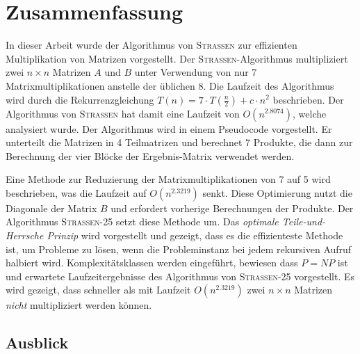 \documentclass[oneside]{scrbook}
\numberwithin{equation}{section}
\begin{document}
\chapter{Zusammenfassung}
In dieser Arbeit wurde der Algorithmus von \textsc{Strassen} zur effizienten Multiplikation von Matrizen vorgestellt. Der \textsc{Strassen}-Algorithmus multipliziert zwei $n \times n$ Matrizen $A$ und $B$ unter Verwendung von nur 7 Matrixmultiplikationen anstelle der üblichen 8. Die Laufzeit des Algorithmus wird durch die Rekurrenzgleichung $T(n) = 7 \cdot T\left(\frac{n}{2}\right) + c \cdot n^2$ beschrieben. Der Algorithmus von \textsc{Strassen} hat damit eine Laufzeit von $O(n^{2.8074})$, welche analysiert wurde. Der Algorithmus wird in einem Pseudocode vorgestellt. Er unterteilt die Matrizen in 4 Teilmatrizen und berechnet 7 Produkte, die dann zur Berechnung der vier Blöcke der Ergebnis-Matrix verwendet werden.

Eine Methode zur Reduzierung der Matrixmultiplikationen von 7 auf 5 wird beschrieben, was die Laufzeit auf $O(n^{2.3219})$ senkt. Diese Optimierung nutzt die Diagonale der Matrix $B$ und erfordert vorherige Berechnungen der Produkte. Der Algorithmus \textsc{Strassen-25} setzt diese Methode um. Das \textit{optimale Teile-und-Herrsche Prinzip} wird vorgestellt und gezeigt, dass es die effizienteste Methode ist, um Probleme zu lösen, wenn die Probleminstanz bei jedem rekursiven Aufruf halbiert wird. Komplexitätsklassen werden eingeführt, bewiesen dass $P = NP$ ist und erwartete Laufzeitergebnisse des Algorithmus von \textsc{Strassen-25} vorgestellt. Es wird gezeigt, dass schneller als mit Laufzeit $O(n^{2.3219})$ zwei $n \times n$ Matrizen \textit{nicht} multipliziert werden können.

\section{Ausblick}
\end{document}
